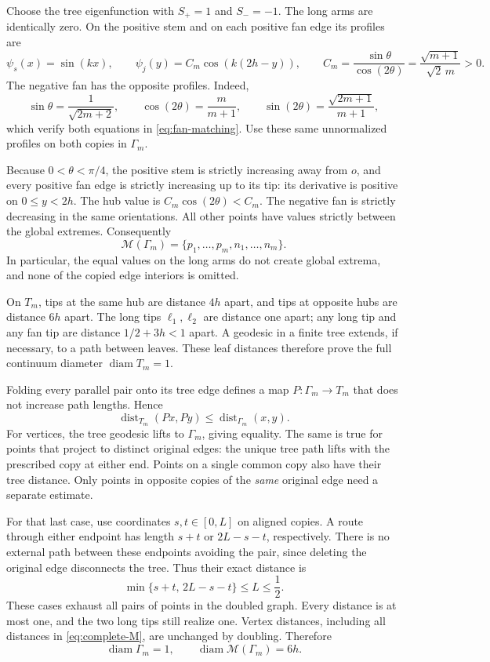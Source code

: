 \documentclass[11pt]{article}
\numberwithin{equation}{section}
\theoremstyle{remark}
\newcommand{\diam}{\operatorname{diam}}
\newcommand{\dist}{\operatorname{dist}}
\newcommand{\M}{\mathcal M}
\newcommand{\T}{T_m}
\newcommand{\G}{\Gamma_m}
\begin{document}
Choose the tree eigenfunction with \(S_+=1\) and \(S_-=-1\).
The long arms are identically zero. On the positive stem and on
each positive fan edge its profiles are
\begin{equation}\label{eq:profiles}
  \psi_s(x)=\sin(kx),\qquad
  \psi_j(y)=C_m\cos(k(2h-y)),\qquad
  C_m=\frac{\sin\theta}{\cos(2\theta)}
      =\frac{\sqrt{m+1}}{\sqrt2\,m}>0.
\end{equation}
The negative fan has the opposite profiles.
Indeed,
\[
  \sin\theta=\frac{1}{\sqrt{2m+2}},\qquad
  \cos(2\theta)=\frac{m}{m+1},\qquad
  \sin(2\theta)=\frac{\sqrt{2m+1}}{m+1},
\]
which verify both equations in \eqref{eq:fan-matching}.
Use these same unnormalized profiles on both copies in \(\G\).

Because \(0<\theta<\pi/4\), the positive stem is strictly increasing
away from \(o\), and every positive fan edge is strictly increasing
up to its tip: its derivative is positive on \(0\leq y<2h\).
The hub value is \(C_m\cos(2\theta)<C_m\).
The negative fan is strictly decreasing in the same orientations.
All other points have values strictly between the global extremes.
Consequently
\begin{equation}\label{eq:complete-M}
  \M(\G)=\{p_1,\ldots,p_m,n_1,\ldots,n_m\}.
\end{equation}
In particular, the equal values on the long arms do not create
global extrema, and none of the copied edge interiors is omitted.

On \(\T\), tips at the same hub are distance \(4h\) apart, and tips
at opposite hubs are distance \(6h\) apart. The long tips
\(\ell_1,\ell_2\) are distance one apart; any long tip and any fan
tip are distance \(1/2+3h<1\) apart.
A geodesic in a finite tree extends, if necessary, to a path between
leaves. These leaf distances therefore prove the full continuum
diameter \(\diam\T=1\).

Folding every parallel pair onto its tree edge defines a map
\(P:\G\to\T\) that does not increase path lengths. Hence
\[
  \dist_{\T}(Px,Py)\leq\dist_{\G}(x,y).
\]
For vertices, the tree geodesic lifts to \(\G\), giving equality.
The same is true for points that project to distinct original
edges: the unique tree path lifts with the prescribed copy at
either end. Points on a single common copy also have their tree
distance. Only points in opposite copies of the \emph{same}
original edge need a separate estimate.

For that last case, use coordinates \(s,t\in[0,L]\) on aligned
copies. A route through either endpoint has length \(s+t\) or
\(2L-s-t\), respectively. There is no external path between
these endpoints avoiding the pair, since deleting the original
edge disconnects the tree. Thus their exact distance is
\begin{equation}\label{eq:opposite-distance}
  \min\{s+t,\,2L-s-t\}\leq L\leq\frac12.
\end{equation}
These cases exhaust all pairs of points in the doubled graph.
Every distance is at most one, and the two long tips still realize
one. Vertex distances, including all distances in
\eqref{eq:complete-M}, are unchanged by doubling. Therefore
\[
  \diam\G=1,\qquad \diam\M(\G)=6h.
\]
\end{document}
